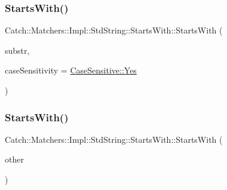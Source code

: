 \subsubsection{\texorpdfstring{Starts\+With()}{StartsWith()}\hspace{0.1cm}{\footnotesize\ttfamily [1/2]}}
{\footnotesize\ttfamily Catch\+::\+Matchers\+::\+Impl\+::\+Std\+String\+::\+Starts\+With\+::\+Starts\+With (\begin{DoxyParamCaption}\item[{std\+::string const \&}]{substr,  }\item[{\hyperlink{struct_catch_1_1_case_sensitive_aad49d3aee2d97066642fffa919685c6a}{Case\+Sensitive\+::\+Choice}}]{case\+Sensitivity = {\ttfamily \hyperlink{struct_catch_1_1_case_sensitive_aad49d3aee2d97066642fffa919685c6aa7c5550b69ec3c502e6f609b67f9613c6}{Case\+Sensitive\+::\+Yes}} }\end{DoxyParamCaption})\hspace{0.3cm}{\ttfamily [inline]}}

\hypertarget{struct_catch_1_1_matchers_1_1_impl_1_1_std_string_1_1_starts_with_a5526cb587632e7e46253d6f60ae01098}{}\label{struct_catch_1_1_matchers_1_1_impl_1_1_std_string_1_1_starts_with_a5526cb587632e7e46253d6f60ae01098} 
\subsubsection{\texorpdfstring{Starts\+With()}{StartsWith()}\hspace{0.1cm}{\footnotesize\ttfamily [2/2]}}
{\footnotesize\ttfamily Catch\+::\+Matchers\+::\+Impl\+::\+Std\+String\+::\+Starts\+With\+::\+Starts\+With (\begin{DoxyParamCaption}\item[{\hyperlink{struct_catch_1_1_matchers_1_1_impl_1_1_std_string_1_1_starts_with}{Starts\+With} const \&}]{other }\end{DoxyParamCaption})\hspace{0.3cm}{\ttfamily [inline]}}

\hypertarget{struct_catch_1_1_matchers_1_1_impl_1_1_std_string_1_1_starts_with_ad22a0d01b6c29bd4784ffff988e99992}{}\label{struct_catch_1_1_matchers_1_1_impl_1_1_std_string_1_1_starts_with_ad22a0d01b6c29bd4784ffff988e99992} 
